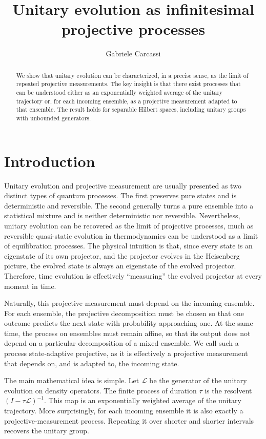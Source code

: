 \documentclass{techbrief}
\title{Unitary evolution as infinitesimal projective processes}
\author{Gabriele Carcassi}
\begin{document}
\maketitle

\begin{abstract}
	We show that unitary evolution can be characterized, in a precise sense, as the limit of repeated projective measurements. The key insight is that there exist processes that can be understood either as an exponentially weighted average of the unitary trajectory or, for each incoming ensemble, as a projective measurement adapted to that ensemble. The result holds for separable Hilbert spaces, including unitary groups with unbounded generators.
\end{abstract}

\section{Introduction}

Unitary evolution and projective measurement are usually presented as two distinct types of quantum processes. The first preserves pure states and is deterministic and reversible. The second generally turns a pure ensemble into a statistical mixture and is neither deterministic nor reversible. Nevertheless, unitary evolution can be recovered as the limit of projective processes, much as reversible quasi-static evolution in thermodynamics can be understood as a limit of equilibration processes. The physical intuition is that, since every state is an eigenstate of its own projector, and the projector evolves in the Heisenberg picture, the evolved state is always an eigenstate of the evolved projector. Therefore, time evolution is effectively ``measuring'' the evolved projector at every moment in time.

Naturally, this projective measurement must depend on the incoming ensemble. For each ensemble, the projective decomposition must be chosen so that one outcome predicts the next state with probability approaching one. At the same time, the process on ensembles must remain affine, so that its output does not depend on a particular decomposition of a mixed ensemble. We call such a process state-adaptive projective, as it is effectively a projective measurement that depends on, and is adapted to, the incoming state.

The main mathematical idea is simple. Let $\mathcal{L}$ be the generator of the unitary evolution on density operators. The finite process of duration $\tau$ is the resolvent $(I-\tau\mathcal{L})^{-1}$. This map is an exponentially weighted average of the unitary trajectory. More surprisingly, for each incoming ensemble it is also exactly a projective-measurement process. Repeating it over shorter and shorter intervals recovers the unitary group.
\end{document}

